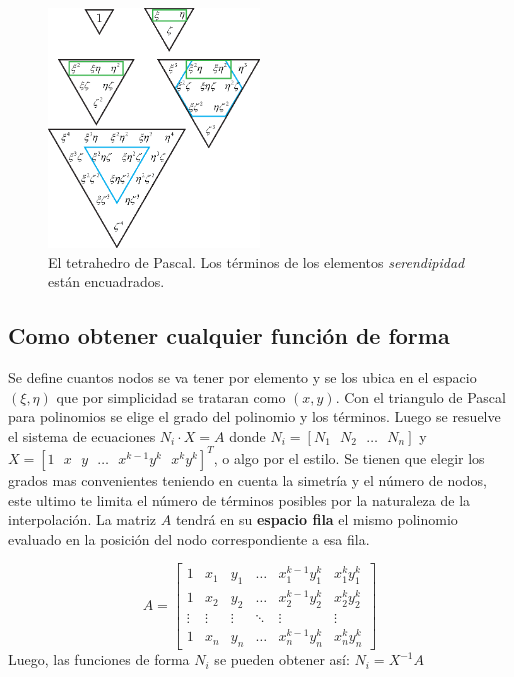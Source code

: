 \documentclass[draft,11pt, a4paper,titlepage]{article}
\newcommand{\ms}{\ \ \ } %
\begin{document}
\begin{figure}
    \centering
    \includegraphics[width=0.5\textwidth]{fig/pascalsTetra.eps}
    \caption{El tetrahedro de Pascal. Los términos de los elementos \textit{serendipidad} están encuadrados.}
    \label{fig:PascalsTetrahedron}
\end{figure}

\subsection{Como obtener cualquier función de forma}
Se define cuantos nodos se va tener por elemento y se los ubica en el espacio $(\xi,\eta)$ que por simplicidad se trataran como $(x,y)$. Con el triangulo de Pascal para polinomios se elige el grado del polinomio y los términos. Luego se resuelve el sistema de ecuaciones $N_i\cdot X= A$ donde $N_i=[N_1\ms N_2 \ms \ldots\ms N_n]$ y $X=[1\ms x\ms y \ms\ldots\ms x^{k-1}y^{k} \ms x^{k}y^{k}]^T$, o algo por el estilo. Se tienen que elegir los grados mas convenientes teniendo en cuenta la simetría y el número de nodos, este ultimo te limita el número de términos posibles por la naturaleza de la interpolación. La matriz $A$ tendrá en su \textbf{espacio fila} el mismo polinomio evaluado en la posición del nodo correspondiente a esa fila.

\[
A=
\begin{bmatrix}
    1 & x_1 & y_1 & \dots  & x_{1}^{k-1}y_1^{k} & x_{1}^{k}y_1^{k} \\
    1 & x_2 & y_2 & \dots  & x_{2}^{k-1}y_2^{k} & x_{2}^{k}y_2^{k} \\
    \vdots & \vdots & \vdots & \ddots & \vdots& \vdots \\
    1 & x_n & y_n & \dots  & x_{n}^{k-1}y_n^{k} & x_{n}^{k}y_n^{k}
\end{bmatrix}
\]
Luego, las funciones de forma $N_i$ se pueden obtener así: $N_i=X^{-1} A$
\end{document}

